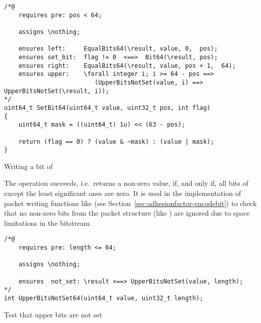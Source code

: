 \begin{listing}[hbt]
\begin{minipage}{0.99\textwidth}
\begin{lstlisting}[style=acsl-block]
/*@
    requires pre: pos < 64;

    assigns \nothing;

    ensures left:     EqualBits64(\result, value, 0,  pos);
    ensures set_bit:  flag != 0  <==>  Bit64(\result, pos);
    ensures right:    EqualBits64(\result, value, pos + 1,  64);
    ensures upper:    \forall integer i; i >= 64 - pos ==>
                         (UpperBitsNotSet(value, i) ==> UpperBitsNotSet(\result, i));
*/
uint64_t SetBit64(uint64_t value, uint32_t pos, int flag)
{
    uint64_t mask = ((uint64_t) 1u) << (63 - pos);

    return (flag == 0) ? (value & ~mask) : (value | mask);
}
\end{lstlisting}
\end{minipage}
\caption{\label{lst:SetBit64}Writing a bit of }
\end{listing}

\FloatBarrier




The operation  succeeds,
i.e.\ returns a
non-zero value, if, and only if, all bits of  except
the least significant
 ones are zero.
%
It is used in the implementation of packet writing functions like
(see Section~\ref{sec:adhesionfactor-encodebit})
to check that no non-zero bits from the packet structure (like
) are ignored due to space
limitations in the bitstream.





\begin{listing}[hbt]
\begin{minipage}{0.99\textwidth}
\begin{lstlisting}[style=acsl-block]
/*@
    requires pre: length <= 64;

    assigns \nothing;

    ensures  not_set: \result <==> UpperBitsNotSet(value, length);
*/
int UpperBitsNotSet64(uint64_t value, uint32_t length);
\end{lstlisting}
\end{minipage}
\caption{\label{lst:UpperBitsNotSet64}Test that upper bits are not set}
\end{listing}
%











